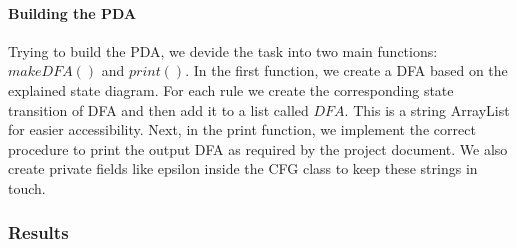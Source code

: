 \documentclass[
12pt, %
a4paper, %
oneside, %
headinclude,footinclude, %
BCOR5mm, %
]{scrartcl}
\begin{document}
\paragraph{Building the PDA} Trying to build the PDA, we devide the task into two main functions: $makeDFA()$ and $print()$. In the first function, we create a DFA based on the explained state diagram. For each rule we create the corresponding state transition of DFA and then add it to a list called $DFA$. This is a string ArrayList for easier accessibility. Next, in the print function, we implement the correct procedure to print the output DFA as required by the project document. We also create private fields like epsilon inside the CFG class to keep these strings in touch.
\subsubsection{Results}
\end{document}
